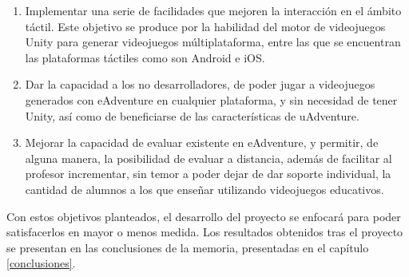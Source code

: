 \begin{enumerate}
	\item Implementar una serie de facilidades que mejoren la interacción en el ámbito táctil. Este objetivo se produce por la habilidad del motor de videojuegos Unity para generar videojuegos múltiplataforma, entre las que se encuentran las plataformas táctiles como son Android e iOS. 
	
	\item Dar la capacidad a los no desarrolladores, de poder jugar a videojuegos generados con eAdventure en cualquier plataforma, y sin necesidad de tener Unity, así como de beneficiarse de las características de uAdventure.
	
	\item Mejorar la capacidad de evaluar existente en eAdventure, y permitir, de alguna manera, la posibilidad de evaluar a distancia, además de facilitar al profesor incrementar, sin temor a poder dejar de dar soporte individual, la cantidad de alumnos a los que enseñar utilizando videojuegos educativos.
\end{enumerate}

Con estos objetivos planteados, el desarrollo del proyecto se enfocará para poder satisfacerlos en mayor o menos medida. Los resultados obtenidos tras el proyecto se presentan en las conclusiones de la memoria, presentadas en el capítulo \ref{conclusiones}.